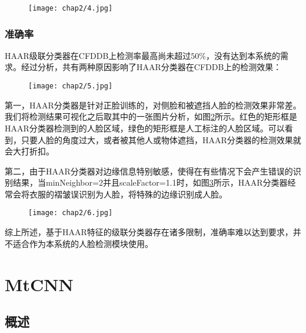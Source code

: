\begin{figure}[!htp]
	\centering
	\texttt{[image: chap2/4.jpg]}
	\label{fig:haartest:speed}
\end{figure}

\subsubsection{准确率}

HAAR级联分类器在CFDDB上检测率最高尚未超过$50\%$，没有达到本系统的需求。经过分析，共有两种原因影响了HAAR分类器在CFDDB上的检测效果：

\begin{figure}[!htp]
	\centering
	\texttt{[image: chap2/5.jpg]}
	\label{fig:haartest:acc}
\end{figure}

第一，HAAR分类器是针对正脸训练的，对侧脸和被遮挡人脸的检测效果非常差。我们将检测结果可视化之后取其中的一张图片分析，如图\ref{fig:haartest:acc}所示。红色的矩形框是HAAR分类器检测到的人脸区域，绿色的矩形框是人工标注的人脸区域。可以看到，只要人脸的角度过大，或者被其他人或物体遮挡，HAAR分类器的检测效果就会大打折扣。

第二，由于HAAR分类器对边缘信息特别敏感，使得在有些情况下会产生错误的识别结果，当minNeighbor=2并且scaleFactor=1.1时，如图\ref{fig:haartest:acc2}所示，HAAR分类器经常会将衣服的褶皱误识别为人脸，将特殊的边缘识别成人脸。

\begin{figure}[!htp]
	\centering
	\texttt{[image: chap2/6.jpg]}
	\label{fig:haartest:acc2}
\end{figure}

综上所述，基于HAAR特征的级联分类器存在诸多限制，准确率难以达到要求，并不适合作为本系统的人脸检测模块使用。


\section{MtCNN}

\subsection{概述}


